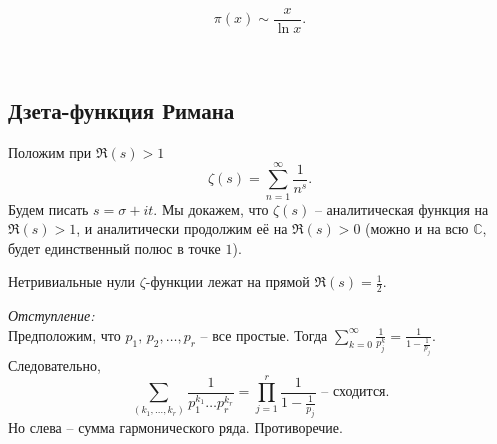 \begin{theorem} \label{l1_thm2}
	$$\pi(x) \sim \frac{x}{\ln x}.$$
\end{theorem}~\\

\subsection{Дзета-функция Римана}
Положим при $\Re(s) > 1$
$$\zeta(s) = \sum_{n=1}^\infty \frac{1}{n^s}.$$
Будем писать $s = \sigma + it$. Мы докажем, что $\zeta(s)$ -- аналитическая функция на $\Re(s) > 1$, и аналитически продолжим её на $\Re(s) > 0$ (можно и на всю $\mathbb{C}$, будет единственный полюс в точке $1$).

\begin{theorem} \label{l1_RiemannHypothesis}
	Нетривиальные нули $\zeta$-функции лежат на прямой $\Re(s) = \frac{1}{2}$.
\end{theorem}

\textit{Отступление:}\\
	Предположим, что $p_1,\,p_2,\dots,p_r$ -- все простые. Тогда 
	$\displaystyle \sum\limits_{k=0}^\infty \frac{1}{p_j^k} = \frac{1}{1-\frac{1}{p_j}}$. Следовательно,
	$$\sum_{(k_1,\dots,k_r)} \frac{1}{p_1^{k_1} \dots p_r^{k_r}} = \prod_{j=1}^r \frac{1}{1-\frac{1}{p_j}} \text{ -- сходится}.$$
	Но слева -- сумма гармонического ряда. Противоречие.